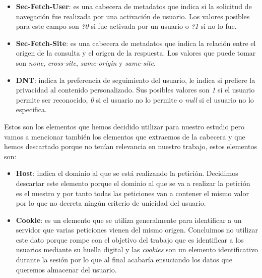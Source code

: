 \begin{itemize}
    \item \textbf{Sec-Fetch-User}: es una cabecera de metadatos que indica si la solicitud de navegación fue realizada por una activación de usuario. Los valores posibles para este campo son \textit{?0} si fue activada por un usuario o \textit{?1} si no lo fue.
    \item \textbf{Sec-Fetch-Site}: es una cabecera de metadatos que indica la relación entre el origen de la consulta y el origen de la respuesta. Los valores que puede tomar son \textit{none}, \textit{cross-site}, \textit{same-origin} y \textit{same-site}.
    \item \textbf{DNT}: indica la preferencia de seguimiento del usuario, le indica si prefiere la privacidad al contenido personalizado. Sus posibles valores son \textit{1} si el usuario permite ser reconocido, \textit{0} si el usuario no lo permite o \textit{null} si el usuario no lo especifica.
\end{itemize}
Estos son los elementos que hemos decidido utilizar para nuestro estudio pero vamos a mencionar también los elementos que extraemos de la cabecera y que hemos descartado porque no tenían relevancia en nuestro trabajo, estos elementos son:
\begin{itemize}
    \item \textbf{Host}: indica el dominio al que se está realizando la petición. Decidimos descartar este elemento porque el dominio al que se va a realizar la petición es el nuestro y por tanto todas las peticiones van a contener el mismo valor por lo que no decreta ningún criterio de unicidad del usuario.
    \item \textbf{Cookie}: es un elemento que se utiliza generalmente para identificar a un servidor que varias peticiones vienen del mismo origen. Concluimos no utilizar este dato porque rompe con el objetivo del trabajo que es identificar a los usuarios mediante su huella digital y las \textit{cookies} son un elemento identificativo durante la sesión por lo que al final acabaría ensuciando los datos que queremos almacenar del usuario.
\end{itemize}

